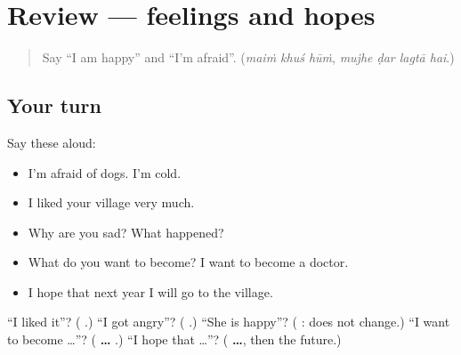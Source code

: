\section[(review)]{Review — feelings and hopes}

\label{lesson:HI-R284-feelings-and-hopes}



\begin{quote}
Say \textquotedblleft{}I am happy\textquotedblright{} and \textquotedblleft{}I'm afraid\textquotedblright{}. (\emph{maiṁ khuś hūṁ}, \emph{mujhe ḍar lagtā hai}.)
\end{quote}

\subsection*{Your turn}
Say these aloud:

\begin{itemize}
\raggedright
  \item I'm afraid of dogs. I'm cold.
  \item I liked your village very much.
  \item Why are you sad? What happened?
  \item What do you want to become? I want to become a doctor.
  \item I hope that next year I will go to the village.
\end{itemize}

\begin{tcolorbox}[breakable,colback=teal!4,colframe=teal!35!black,title={Before you move on}]
\textquotedblleft{}I liked it\textquotedblright{}? (\textbf{  }.) \textquotedblleft{}I got angry\textquotedblright{}? (\textbf{  }.) \textquotedblleft{}She is happy\textquotedblright{}? (\textbf{  }: \textbf{} does not change.) \textquotedblleft{}I want to become …\textquotedblright{}? (\textbf{ …   }.) \textquotedblleft{}I hope that …\textquotedblright{}? (\textbf{    …}, then the future.)
\end{tcolorbox}
